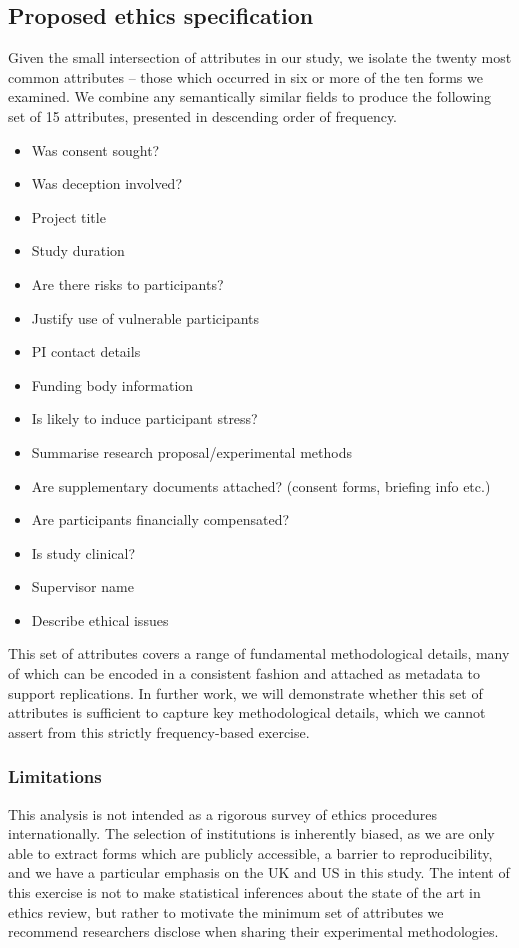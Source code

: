 \subsection{Proposed ethics specification}
Given the small intersection of
attributes in our study, we isolate the twenty most common attributes -- those
which occurred in six or more of the ten forms we examined. We combine any
semantically similar fields to produce the following set of 15 attributes,
presented in descending order of frequency.

\begin{itemize}
	\item Was consent sought?
	\item Was deception involved?
	\item Project title
	\item Study duration
	\item Are there risks to participants?
	\item Justify use of vulnerable participants
	\item PI contact details
	\item Funding body information
	\item Is likely to induce participant stress?
	\item Summarise research proposal/experimental methods
	\item Are supplementary documents attached? (consent forms, briefing info etc.)
	\item Are participants financially compensated?
	\item Is study clinical?
	\item Supervisor name
	\item Describe ethical issues 
\end{itemize}

This set of attributes covers a range of fundamental methodological details,
many of which can be encoded in a consistent fashion and attached as metadata
to support replications. In further work, we will demonstrate whether this set
of attributes is sufficient to capture key methodological details, which we
cannot assert from this strictly frequency-based exercise.

\subsubsection{Limitations}
This analysis is not intended as a rigorous survey
of ethics procedures internationally. The selection of institutions is
inherently biased, as we are only able to extract forms which are publicly
accessible, a barrier to reproducibility, and we have a particular emphasis on
the UK and US in this study. The intent of this exercise is not to make
statistical inferences about the state of the art in ethics review, but rather
to motivate the minimum set of attributes we recommend researchers disclose
when sharing their experimental methodologies.



